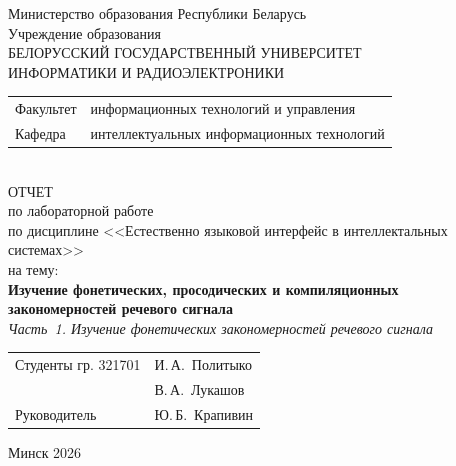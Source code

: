 \begin{titlepage}
	\begin{center}
		Министерство образования Республики Беларусь\\[1em]
		Учреждение образования\\
		БЕЛОРУССКИЙ ГОСУДАРСТВЕННЫЙ УНИВЕРСИТЕТ \\
		ИНФОРМАТИКИ И РАДИОЭЛЕКТРОНИКИ\\[1em]
		
		\begin{minipage}{\textwidth}
			\begin{flushleft}
				\begin{tabular}{ l l }
					Факультет & информационных технологий и управления\\
					Кафедра   & интеллектуальных информационных технологий
				\end{tabular}
			\end{flushleft}
		\end{minipage}\\[1em]
		
		
		{ОТЧЕТ}\\
		{по лабораторной работе}\\
		{по дисциплине <<Естественно языковой интерфейс в интеллектальных системах>>}\\
		{на тему:}\\[1em]
		\textbf{\large Изучение фонетических, просодических и компиляционных
		закономерностей речевого сигнала}\\[0.3em]
		{\large\itshape Часть~1. Изучение фонетических закономерностей речевого сигнала}\\[1em]
		
		
		\vspace{2em}
		\begin{tabular}{ p{}p{} }
			Студенты гр. 321701 & И.\,А.~Политыко \\
			& В.\,А.~Лукашов \\
			Руководитель & Ю.\,Б.~Крапивин \\

		\end{tabular}
		
		\vfill
		{\normalsize Минск 2026}
	\end{center}
\end{titlepage}
